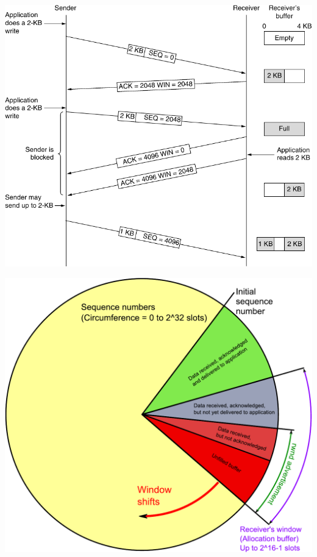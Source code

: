 
\begin{minipage}{.48\linewidth}
  \includegraphics[width=\columnwidth]{slidingwindow-ast}  
\end{minipage}\hfill
\begin{minipage}{.48\linewidth}
  \includegraphics[width=\columnwidth]{slidingwindow-wiki}
\end{minipage}

